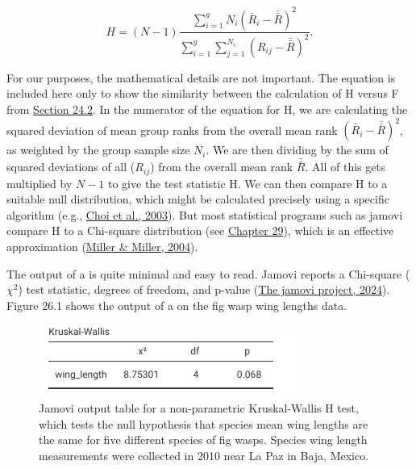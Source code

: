 \documentclass[
  openany]{krantz}
\begin{document}
\[H = (N - 1) \frac{\sum_{i=1}^{g}N_{i}\left(\bar{R}_{i} - \bar{\bar R} \right)^2}{\sum_{i=1}^{g}\sum_{j=1}^{N_{i}} \left(R_{ij} - \bar{\bar R} \right)^{2}}.\]

For our purposes, the mathematical details are not important.
The equation is included here only to show the similarity between the calculation of H versus F from \protect\hyperlink{one-way-anova}{Section 24.2}.
In the numerator of the equation for H, we are calculating the squared deviation of mean group ranks from the overall mean rank \((\bar{R}_{i} - \bar{\bar R})^2\), as weighted by the group sample size \(N_{i}\).
We are then dividing by the sum of squared deviations of all  (\(R_{ij}\)) from the overall mean rank \(\bar{\bar R}\).
All of this gets multiplied by \(N - 1\) to give the test statistic H.
We can then compare H to a suitable null distribution, which might be calculated precisely using a specific algorithm (e.g., \protect\hyperlink{ref-Choi2003}{Choi et al., 2003}).
But most statistical programs such as jamovi compare H to a Chi-square distribution (see \protect\hyperlink{Chapter_29}{Chapter 29}), which is an effective approximation (\protect\hyperlink{ref-Miller2004}{Miller \& Miller, 2004}).

The output of a  is quite minimal and easy to read.
Jamovi reports a Chi-square (\(\chi^{2}\)) test statistic, degrees of freedom, and p-value (\protect\hyperlink{ref-Jamovi2022}{The jamovi project, 2024}).
Figure 26.1 shows the output of a  on the fig wasp wing lengths data.

\begin{figure}
\includegraphics[width=1\linewidth]{img/jamovi_kruskall-wallis_test} \caption{Jamovi output table for a non-parametric Kruskal-Wallis H test, which tests the null hypothesis that species mean wing lengths are the same for five different species of fig wasps. Species wing length measurements were collected in 2010 near La Paz in Baja, Mexico.}\label{fig:unnamed-chunk-106}
\end{figure}
\end{document}

